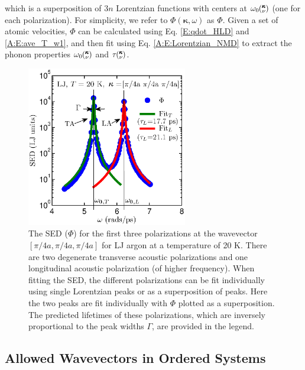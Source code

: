 \documentclass[letterpaper,12pt]{article}
\newcommand{\kv}{\mspace{-4.0mu}\left(\mspace{-8.0mu}\begin{smallmatrix}&\pmb{\kappa} \\&\nu\end{smallmatrix}\mspace{-3.0mu}\right)}
\begin{document}
which is a superposition of $3n$ Lorentzian functions with centers at $\omega_0\kv$ (one for each polarization). For simplicity, we refer to $\Phi(\pmb{\kappa},\omega)$ as $\Phi$. Given a set of atomic velocities, $\Phi$ can be calculated using Eq$.$ \eqref{E:qdot_HLD} and \eqref{A:E:ave_T_w1}, and then fit using Eq$.$ \eqref{A:E:Lorentzian_NMD} to extract the phonon properties $\omega_0\kv$ and $\tau\kv$.

\begin{figure}
\begin{center}
\includegraphics[angle=0,width=70.0mm]{LJ_FIT_PEAK.eps}
\vspace*{-5mm}
\end{center}
\caption{\label{FIG:LJ_FIT_PEAK} The SED ($\Phi$) for the first three polarizations at the wavevector $[\pi/4a,\pi/4a,\pi/4a]$ for LJ argon at a temperature of 20 K. There are two degenerate transverse acoustic polarizations and one longitudinal acoustic polarization (of higher frequency).\cite{dove1993} When fitting the SED, the different polarizations can be fit individually using single Lorentzian peaks or as a superposition of peaks. Here the two peaks are fit individually with $\Phi$ plotted as a superposition. The predicted lifetimes of these polarizations, which are inversely proportional to the peak widths $\Gamma$, are provided in the legend.}
\end{figure}

\subsection{\label{A-Allowed-Wavevectors-Ordered}Allowed Wavevectors in Ordered Systems}
\end{document}
